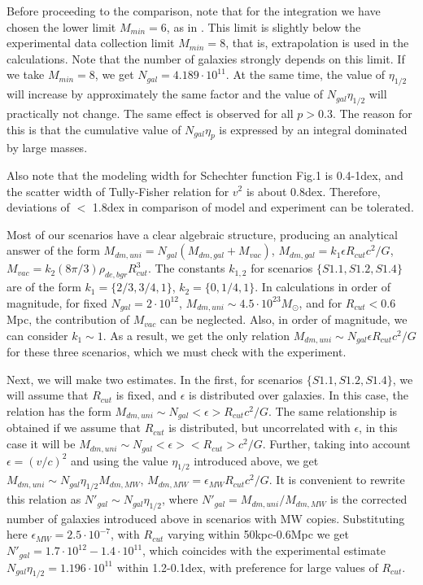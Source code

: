 \documentclass{article}
\begin{document}
Before proceeding to the comparison, note that for the integration we have chosen the lower limit $ M_ {min} = 6 $, as in \cite {1607.03909v2}. This limit is slightly below the experimental data collection limit $ M_ {min} = 8 $, that is, extrapolation is used in the calculations. Note that the number of galaxies strongly depends on this limit. If we take $ M_ {min} = 8 $, we get $ N_ {gal} = 4.189 \cdot10 ^ {11} $. At the same time, the value of $ \eta_ {1/2} $ will increase by approximately the same factor and the value of $ N_ {gal} \eta_ {1/2} $ will practically not change. The same effect is observed for all $ p> 0.3 $. The reason for this is that the cumulative value of $ N_ {gal} \eta_p $ is expressed by an integral dominated by large masses.

Also note that the modeling width for Schechter function Fig.1 \cite {1607.03909v2} is 0.4-1dex, and the scatter width of Tully-Fisher relation \cite {astro-ph/0609076} for $ v ^ 2 $ is about 0.8dex. Therefore, deviations of $ <$ 1.8dex in comparison of model and experiment can be tolerated.

Most of our scenarios have a clear algebraic structure, producing an analytical answer of the form $ M_ {dm, uni} = N_ {gal} (M_ {dm, gal} + M_ {vac}) $, $ M_ {dm, gal} = k_1 \epsilon R_ {cut} c ^ 2 / G $, $ M_ {vac} = k_2 (8 \pi / 3) \rho_ {de, bgr} R_ {cut} ^ 3 $. The constants $ k_ {1,2} $ for scenarios $ \{S1.1, S1.2, S1.4 \} $ are of the form $ k_1 = \{2 / 3,3 / 4,1 \} $, $ k_2 = \{0,1 / 4,1 \} $. In calculations in order of magnitude, for fixed $ N_ {gal} = 2 \cdot10 ^ {12} $, $ M_ {dm, uni} \sim4.5 \cdot10 ^ {23} M_ \odot $, and for $ R_ { cut} <0.6 $Mpc, the contribution of $ M_ {vac} $ can be neglected. Also, in order of magnitude, we can consider $ k_1 \sim1 $. As a result, we get the only relation $ M_ {dm, uni} \sim N_ {gal} \epsilon R_ {cut} c ^ 2 / G $ for these three scenarios, which we must check with the experiment.

Next, we will make two estimates. In the first, for scenarios $ \{S1.1, S1.2, S1.4 \} $, we will assume that $ R_ {cut} $ is fixed, and $ \epsilon $ is distributed over galaxies. In this case, the relation has the form $ M_ {dm, uni} \sim N_ {gal} <\epsilon> R_ {cut} c ^ 2 / G $. The same relationship is obtained if we assume that $ R_ {cut} $ is distributed, but uncorrelated with $ \epsilon $, in this case it will be $ M_ {dm, uni} \sim N_ {gal} <\epsilon> <R_ {cut}> c ^ 2 / G $. Further, taking into account $ \epsilon = (v / c) ^ 2 $ and using the value $ \eta_ {1/2} $ introduced above, we get $ M_ {dm, uni} \sim N_ {gal} \eta_ {1/2 } M_ {dm, MW} $, $ M_ {dm, MW} = \epsilon_ {MW} R_ {cut} c ^ 2 / G $. It is convenient to rewrite this relation as $ N '_ {gal} \sim N_ {gal} \eta_ {1/2} $, where $ N' _ {gal} = M_ {dm, uni} / M_ {dm, MW} $ is the corrected number of galaxies introduced above in scenarios with MW copies. Substituting here $ \epsilon_ {MW} = 2.5 \cdot10 ^ {- 7} $, with $ R_ {cut} $ varying within 50kpc-0.6Mpc we get $ N '_ {gal} = 1.7 \cdot10 ^ {12} - 1.4 \cdot10 ^ {11} $, which coincides with the experimental estimate $ N_ {gal} \eta_ {1/2} = 1.196 \cdot10 ^ {11} $ within 1.2-0.1dex, with preference for large values of $ R_ {cut } $.
\end{document}
